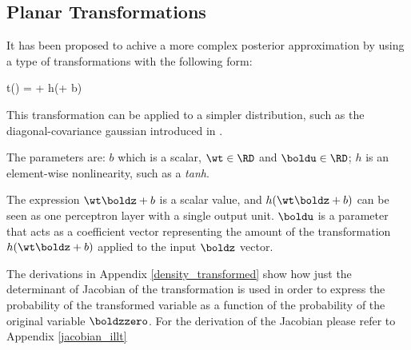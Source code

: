 \subsection{Planar Transformations}
\label{iltt}

It has been proposed\cite{1505.05770} to achive a more complex 
posterior approximation
by using a type of transformations with the following form:

\begin{nalign}
t(\boldz) = \boldz + \boldu h(\wt \boldz + b)
\end{nalign}

This transformation can be applied to a simpler distribution,
such as the diagonal-covariance gaussian
introduced in \cite{1312.6114}.

The parameters are: $b$ which is a scalar, 
$\wt \in \RD$ and $\boldu \in \RD$;
$h$ is an element-wise nonlinearity,
such as a \emph{tanh}.


The expression $\wt \boldz + b$ is a scalar value,
and $h(\wt \boldz + b)$ can be seen as one perceptron layer
with a single output unit. 
$\boldu$ is a parameter that acts as a coefficient vector
representing the amount of the transformation $h(\wt \boldz + b)$
applied to the input $\boldz$ vector.

The derivations in Appendix \ref{density_transformed} show how just the 
determinant of Jacobian of the transformation
is used in order to express the probability of the transformed variable
as a function of the probability of the original variable $\boldzzero$.
For the derivation of the Jacobian please refer to Appendix \ref{jacobian_illt}
